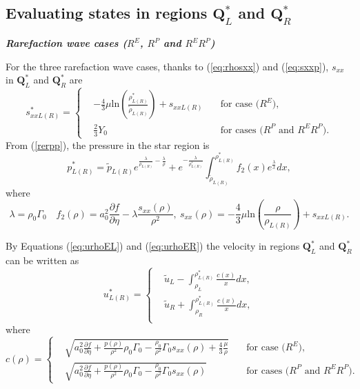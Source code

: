\documentclass{article}
\numberwithin{equation}{section}
\numberwithin{table}{section}
\begin{document}
 \subsection{Evaluating states in regions $\mathbf{Q}_{L}^*$  and  $\mathbf{Q}_{R}^*$}\label{sec:functions}

\emph{\textbf{Rarefaction wave cases ($R^E$, $R^P$ and $R^ER^P$)}}

For the three rarefaction wave cases, thanks to (\ref{eq:rhosxx}) and  (\ref{eq:sxxp}), $s_{xx}$ in $\mathbf{Q}_{L}^*$  and  $\mathbf{Q}_{R}^*$ are
\begin{equation*}
  s_{xxL(R)}^* = \left\{\begin{aligned}
	  & -\frac{4}{3}\mu\text{ln}\left(\frac{\rho_{L(R)}^*}{\tilde{\rho}_{L(R)}}\right)+s_{xxL(R)}  \quad &\text{for case ($R^E$)},\\
	  & \frac{2}{3}Y_0   \quad &\text{for cases ($R^P$ and $R^ER^P$)}.
  \end{aligned} \right.
  \end{equation*}
From (\ref{rerpp}), the pressure in the star region is
\begin{equation}\label{rerpp2}
  p_{L(R)}^*=\tilde{p}_{L(R)}e^{\frac{\lambda}{\rho_{L(R)}}-\frac{\lambda}{\rho}} +e^{-\frac{\lambda}{\rho_{L(R)}^*}}\int_{\tilde{\rho}_{L(R)}}^{\rho_{L(R)}^*} f_2(x) e^{\frac{\lambda}{x}}dx,
\end{equation}
where
\begin{equation*}
  \lambda = \rho_0 \Gamma_0 \quad f_2(\rho) = a_0^2\frac{\partial f}{\partial \eta}- \lambda\frac{s_{xx}(\rho)}{\rho^2}, \ s_{xx}(\rho) =	 -\frac{4}{3}\mu\text{ln}\left(\frac{\rho}{\rho_{L(R)}}\right)+s_{xxL(R)}.
\end{equation*}


 By Equations (\ref{eq:urhoEL}) and (\ref{eq:urhoER})  the velocity in regions $\mathbf{Q}_{L}^*$  and  $\mathbf{Q}_{R}^*$ can be written as
\begin{equation} \label{rerpp1}
  u^*_{L(R)} =\left\{ \begin{aligned}
	  &\tilde{u}_L - \int_{\rho_L}^{\rho^*_{L(R)}} \frac{c(x)}{x} dx,  \\
	  &\tilde{u}_R + \int_{\rho_R}^{\rho^*_{L(R)}} \frac{c(x)}{x} dx, \\
	\end{aligned}
  \right.
\end{equation}
where
\begin{equation*}
  c(\rho) = \left\{ \begin{aligned}
	&  \sqrt{a_0^2 \frac{\partial f}{\partial \eta} + \frac{p(\rho)}{\rho^2}\rho_0\Gamma_0 -\frac{\rho_0}{\rho^2}\Gamma_0 s_{xx}(\rho) +\frac{4}{3}\frac{\mu}{\rho}} \quad & \text{for case ($R^E$)},\\
	&	\sqrt{a_0^2 \frac{\partial f}{\partial \eta} + \frac{p(\rho)}{\rho^2}\rho_0\Gamma_0 -\frac{\rho_0}{\rho^2}\Gamma_0 s_{xx}(\rho)}  \quad  & \text{for cases ($R^P$ and  $R^ER^P$)}.
	\end{aligned}\right.
\end{equation*}
\end{document}
